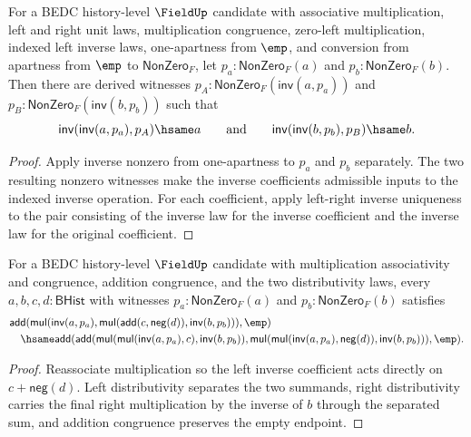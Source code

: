\begin{theorem}
\label{thm:field-affine-inverse-coefficients-derived}
For a BEDC history-level $\FieldUp$ candidate with associative multiplication,
left and right unit laws, multiplication congruence, zero-left multiplication,
indexed left inverse laws, one-apartness from $\emp$, and conversion from
apartness from $\emp$ to $\mathsf{NonZero}_F$, let
$p_a:\mathsf{NonZero}_F(a)$ and $p_b:\mathsf{NonZero}_F(b)$. Then there are
derived witnesses
$p_A:\mathsf{NonZero}_F(\mathsf{inv}(a,p_a))$ and
$p_B:\mathsf{NonZero}_F(\mathsf{inv}(b,p_b))$ such that
$$
\mathsf{inv}(\mathsf{inv}(a,p_a),p_A)\hsame a
\qquad\text{and}\qquad
\mathsf{inv}(\mathsf{inv}(b,p_b),p_B)\hsame b.
$$
\end{theorem}
\begin{proof}
Apply inverse nonzero from one-apartness to $p_a$ and $p_b$ separately. The
two resulting nonzero witnesses make the inverse coefficients admissible
inputs to the indexed inverse operation. For each coefficient, apply
left-right inverse uniqueness to the pair consisting of the inverse law for
the inverse coefficient and the inverse law for the original coefficient.
\end{proof}

\begin{theorem}
\label{thm:field-affine-inverse-offset-empty-normal-form}
For a BEDC history-level $\FieldUp$ candidate with multiplication
associativity and congruence, addition congruence, and the two distributivity
laws, every $a,b,c,d:\mathsf{BHist}$ with witnesses
$p_a:\mathsf{NonZero}_F(a)$ and $p_b:\mathsf{NonZero}_F(b)$ satisfies
$$
\begin{aligned}
&\mathsf{add}(
  \mathsf{mul}(\mathsf{inv}(a,p_a),
    \mathsf{mul}(\mathsf{add}(c,\mathsf{neg}(d)),
      \mathsf{inv}(b,p_b))),\emp)\\
&\quad\hsame
\mathsf{add}(
  \mathsf{add}(
    \mathsf{mul}(\mathsf{mul}(\mathsf{inv}(a,p_a),c),
      \mathsf{inv}(b,p_b)),
    \mathsf{mul}(\mathsf{mul}(\mathsf{inv}(a,p_a),\mathsf{neg}(d)),
      \mathsf{inv}(b,p_b))),\emp).
\end{aligned}
$$
\end{theorem}
\begin{proof}
Reassociate multiplication so the left inverse coefficient acts directly on
$c+\mathsf{neg}(d)$. Left distributivity separates the two summands, right
distributivity carries the final right multiplication by the inverse of $b$
through the separated sum, and addition congruence preserves the empty
endpoint.
\end{proof}

